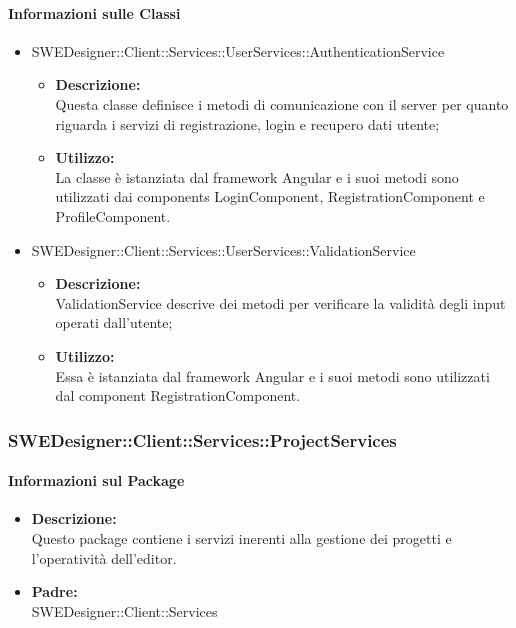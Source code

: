 		\paragraph{Informazioni sulle Classi}
		\begin{itemize}
			\item SWEDesigner::Client::Services::UserServices::AuthenticationService
			\begin{itemize}
				\item \textbf{Descrizione: }\\
				Questa classe definisce i metodi di comunicazione con il server per quanto
				riguarda i servizi di registrazione, login e recupero dati utente;
				\item \textbf{Utilizzo: }\\
				La classe è istanziata dal framework Angular e i suoi metodi sono utilizzati
				dai components LoginComponent, RegistrationComponent e ProfileComponent.
			\end{itemize}
			\item SWEDesigner::Client::Services::UserServices::ValidationService
			\begin{itemize}
				\item \textbf{Descrizione: }\\
				ValidationService descrive dei metodi per verificare la validità degli input
				operati dall'utente;
				\item \textbf{Utilizzo: }\\
				Essa è istanziata dal framework Angular e i suoi metodi sono utilizzati
				dal component RegistrationComponent.
			\end{itemize}
		\end{itemize}


		\subsubsection{SWEDesigner::Client::Services::ProjectServices}
		\paragraph{Informazioni sul Package}
		\begin{itemize}
			\item \textbf{Descrizione: }\\
			Questo package contiene i servizi inerenti alla gestione dei progetti e
			l'operatività dell'editor.
			\item \textbf{Padre: }\\ SWEDesigner::Client::Services
		\end{itemize}

